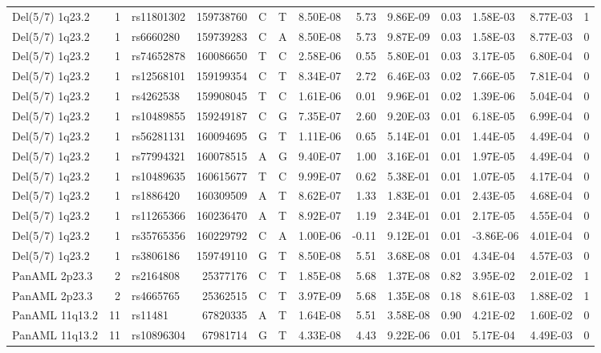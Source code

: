 \begin{table}[ht]
\begin{tabular}{lrlrlllrlrllr}
  Del(5/7) 1q23.2 &   1 & rs11801302 & 159738760 & C & T & 8.50E-08 & 5.73 & 9.86E-09 & 0.03 & 1.58E-03 & 8.77E-03 &   1 \\ 
  Del(5/7) 1q23.2 &   1 & rs6660280 & 159739283 & C & A & 8.50E-08 & 5.73 & 9.87E-09 & 0.03 & 1.58E-03 & 8.77E-03 &   0 \\ 
  Del(5/7) 1q23.2 &   1 & rs74652878 & 160086650 & T & C & 2.58E-06 & 0.55 & 5.80E-01 & 0.03 & 3.17E-05 & 6.80E-04 &   0 \\ 
  Del(5/7) 1q23.2 &   1 & rs12568101 & 159199354 & C & T & 8.34E-07 & 2.72 & 6.46E-03 & 0.02 & 7.66E-05 & 7.81E-04 &   0 \\ 
  Del(5/7) 1q23.2 &   1 & rs4262538 & 159908045 & T & C & 1.61E-06 & 0.01 & 9.96E-01 & 0.02 & 1.39E-06 & 5.04E-04 &   0 \\ 
  Del(5/7) 1q23.2 &   1 & rs10489855 & 159249187 & C & G & 7.35E-07 & 2.60 & 9.20E-03 & 0.01 & 6.18E-05 & 6.99E-04 &   0 \\ 
  Del(5/7) 1q23.2 &   1 & rs56281131 & 160094695 & G & T & 1.11E-06 & 0.65 & 5.14E-01 & 0.01 & 1.44E-05 & 4.49E-04 &   0 \\ 
  Del(5/7) 1q23.2 &   1 & rs77994321 & 160078515 & A & G & 9.40E-07 & 1.00 & 3.16E-01 & 0.01 & 1.97E-05 & 4.49E-04 &   0 \\ 
  Del(5/7) 1q23.2 &   1 & rs10489635 & 160615677 & T & C & 9.99E-07 & 0.62 & 5.38E-01 & 0.01 & 1.07E-05 & 4.17E-04 &   0 \\ 
  Del(5/7) 1q23.2 &   1 & rs1886420 & 160309509 & A & T & 8.62E-07 & 1.33 & 1.83E-01 & 0.01 & 2.43E-05 & 4.68E-04 &   0 \\ 
  Del(5/7) 1q23.2 &   1 & rs11265366 & 160236470 & A & T & 8.92E-07 & 1.19 & 2.34E-01 & 0.01 & 2.17E-05 & 4.55E-04 &   0 \\ 
  Del(5/7) 1q23.2 &   1 & rs35765356 & 160229792 & C & A & 1.00E-06 & -0.11 & 9.12E-01 & 0.01 & -3.86E-06 & 4.01E-04 &   0 \\ 
  Del(5/7) 1q23.2 &   1 & rs3806186 & 159749110 & G & T & 8.50E-08 & 5.51 & 3.68E-08 & 0.01 & 4.34E-04 & 4.57E-03 &   0 \\ 
  PanAML 2p23.3 &   2 & rs2164808 & 25377176 & C & T & 1.85E-08 & 5.68 & 1.37E-08 & 0.82 & 3.95E-02 & 2.01E-02 &   1 \\ 
  PanAML 2p23.3 &   2 & rs4665765 & 25362515 & C & T & 3.97E-09 & 5.68 & 1.35E-08 & 0.18 & 8.61E-03 & 1.88E-02 &   1 \\ 
  PanAML 11q13.2 &  11 & rs11481 & 67820335 & A & T & 1.64E-08 & 5.51 & 3.58E-08 & 0.90 & 4.21E-02 & 1.60E-02 &   0 \\ 
  PanAML 11q13.2 &  11 & rs10896304 & 67981714 & G & T & 4.33E-08 & 4.43 & 9.22E-06 & 0.01 & 5.17E-04 & 4.49E-03 &   0 \\ 
   \hline
\end{tabular}
\end{table}

